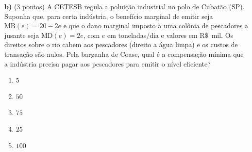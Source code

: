 \textbf{b)} (3 pontos) A CETESB regula a poluição industrial no polo de Cubatão (SP). Suponha que, para certa indústria, o benefício marginal de emitir seja $\text{MB}(e)=20-2e$ e que o dano marginal imposto a uma colônia de pescadores a jusante seja $\text{MD}(e)=2e$, com $e$ em toneladas/dia e valores em R\$~mil. Os direitos sobre o rio cabem aos pescadores (direito a água limpa) e os custos de transação são nulos. Pela barganha de Coase, qual é a compensação mínima que a indústria precisa pagar aos pescadores para emitir o nível eficiente?

\begin{enumerate}[label=\Alph*., leftmargin=3.2em, itemsep=0.05em, topsep=0.1em]
  \item $5$
  \item $50$
  \item $75$
  \item $25$
  \item $100$
\end{enumerate}
